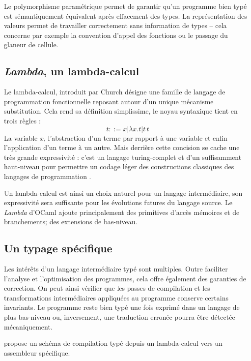 Le polymorphisme paramétrique permet de garantir qu'un programme bien typé est
sémantiquement équivalent après effacement des types. %
La représentation des valeurs permet de travailler correctement sans
information de types -- cela concerne par exemple la convention d'appel des
fonctions ou le passage du glaneur de cellule.

\subsection{\emph{Lambda}, un lambda-calcul}


Le lambda-calcul, introduit par Church désigne une famille de langage de
programmation fonctionnelle reposant autour d'un unique mécanisme substitution.
Cela rend sa définition simplissime, le noyau syntaxique tient en trois règles :
$$t ::= x | \lambda x . t | t \, t$$
La variable $x$, l'abstraction d'un terme par rapport à une variable et enfin
l'application d'un terme à un autre.
Mais derrière cette concision se cache une très grande expressivité : c'est un
langage turing-complet et d'un suffisamment haut-niveau pour permettre un
codage léger des constructions classiques des langages de programmation
\cite{Landin}.

Un lambda-calcul est ainsi un choix naturel pour un langage intermédiaire, son
expressivité sera suffisante pour les évolutions futures du langage source.
Le \emph{Lambda} d'OCaml ajoute principalement des primitives d'accès mémoires
et de branchements; des extensions de bas-niveau.

\subsection{Un typage spécifique}

Les intérêts d'un langage intermédiaire typé sont multiples. Outre faciliter
l'analyse et l'optimisation des programmes, cela offre également des garanties
de correction. On peut ainsi vérifier que les passes de compilation et les
transformations intermédiaires appliquées au programme conserve certains
invariants. Le programme reste bien typé une fois exprimé dans un langage de
plus bas-niveau ou, inversement, une traduction erronée pourra être détectée
mécaniquement.

\cite{MorrisettWCG99} propose un schéma de compilation typé depuis un
lambda-calcul vers un assembleur spécifique.


